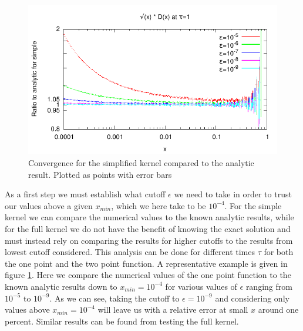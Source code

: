 \documentclass[a4paper,12pt]{article}
\numberwithin{equation}{section}
\begin{document}






\begin{figure}
\centering
\includegraphics[width=0.9\linewidth]{convergence.pdf}
\caption{Convergence for the simplified kernel compared to the analytic result. Plotted as points with error bars}\label{convergence}
\end{figure}

As a first step we must establish what cutoff $\epsilon$ we need to take in order to trust our values above a given $x_{min}$, which we here take to be $10^{-4}$. For the simple kernel we can compare the numerical values to the known analytic results, while for the full kernel we do not have the benefit of knowing the exact solution and must instead rely on comparing the results for higher cutoffs to the results from lowest cutoff considered. This analysis can be done for different times $\tau$ for both the one point and the two point function. A representative example is given in figure \ref{convergence}. Here we compare the numerical values of the one point function to the known analytic results down to $x_{min}=10^{-4}$ for various values of $\epsilon$ ranging from $10^{-5}$ to $10^{-9}$. As we can see, taking the cutoff to $\epsilon=10^{-9}$ and considering only values above $x_{min}=10^{-4}$ will leave us with a relative error at small $x$ around one percent. Similar results can be found from testing the full kernel. 
\end{document}
